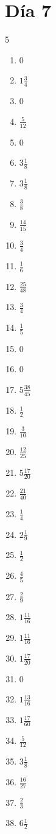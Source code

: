 \documentclass[12pt]{article}
\begin{document}
\section*{Día 7}
\begin{multicols}{5}\begin{enumerate}
\item $ 0 $
\item $ 1 \frac{3}{4} $
\item $ 0 $
\item $ \frac{5}{12} $
\item $ 0 $
\item $ 3 \frac{1}{8} $
\item $ 3 \frac{1}{8} $
\item $ \frac{3}{8} $
\item $ \frac{14}{15} $
\item $ \frac{3}{4} $
\item $ \frac{1}{6} $
\item $ \frac{25}{48} $
\item $ \frac{3}{4} $
\item $ \frac{1}{5} $
\item $ 0 $
\item $ 0 $
\item $ 5 \frac{38}{45} $
\item $ \frac{1}{2} $
\item $ \frac{3}{10} $
\item $ \frac{12}{25} $
\item $ 5 \frac{17}{20} $
\item $ \frac{21}{40} $
\item $ \frac{1}{4} $
\item $ 2 \frac{1}{9} $
\item $ \frac{1}{2} $
\item $ \frac{4}{5} $
\item $ \frac{2}{9} $
\item $ 1 \frac{11}{16} $
\item $ 1 \frac{11}{16} $
\item $ 1 \frac{17}{20} $
\item $ 0 $
\item $ 1 \frac{13}{16} $
\item $ 1 \frac{17}{60} $
\item $ \frac{5}{12} $
\item $ 3 \frac{1}{8} $
\item $ \frac{16}{27} $
\item $ \frac{2}{3} $
\item $ 6 \frac{1}{2} $

\end{enumerate}
\end{multicols}
\end{document}
